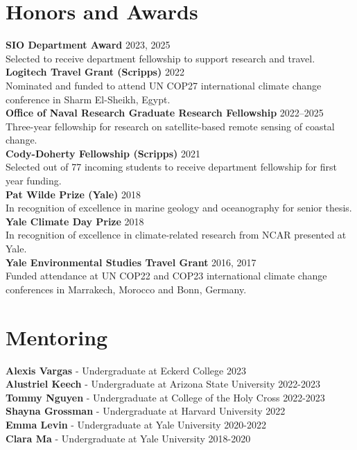 \documentclass[a4paper,10pt]{article}
\begin{document}
\section{Honors and Awards}
    \textbf{SIO Department Award} \hfill 2023, 2025 \\[3.75pt]
    Selected to receive department fellowship to support research and travel. \\[3.75pt]
    \textbf{Logitech Travel Grant (Scripps)} \hfill 2022\\[3.75pt]
    Nominated and funded to attend UN COP27 international climate change conference in Sharm El-Sheikh, Egypt.\\[3.75pt]
    \textbf{Office of Naval Research Graduate Research Fellowship} \hfill 2022--2025\\[3.75pt]
    Three-year fellowship for research on satellite-based remote sensing of coastal change.\\[3.75pt]
    \textbf{Cody-Doherty Fellowship (Scripps)} \hfill 2021\\[3.75pt]
    Selected out of 77 incoming students to receive department fellowship for first year funding.\\[3.75pt]
    \textbf{Pat Wilde Prize (Yale)} \hfill 2018\\[3.75pt]
    In recognition of excellence in marine geology and oceanography for senior thesis.\\[3.75pt]
    \textbf{Yale Climate Day Prize} \hfill 2018\\[3.75pt]
    In recognition of excellence in climate-related research from NCAR presented at Yale.\\[3.75pt]
    \textbf{Yale Environmental Studies Travel Grant} \hfill 2016, 2017\\[3.75pt]
    Funded attendance at UN COP22 and COP23 international climate change conferences in Marrakech, Morocco and Bonn, Germany.

\section{Mentoring}
    \textbf{Alexis Vargas} - Undergraduate at Eckerd College \hfill 2023\\[3.75pt]
    \textbf{Alustriel Keech} - Undergraduate at Arizona State University \hfill 2022-2023\\[3.75pt]
    \textbf{Tommy Nguyen} - Undergraduate at College of the Holy Cross \hfill 2022-2023\\[3.75pt]
    \textbf{Shayna Grossman} - Undergraduate at Harvard University \hfill 2022\\[3.75pt]
    \textbf{Emma Levin} - Undergraduate at Yale University \hfill 2020-2022\\[3.75pt]
    \textbf{Clara Ma} - Undergraduate at Yale University \hfill 2018-2020
    
\end{document}
